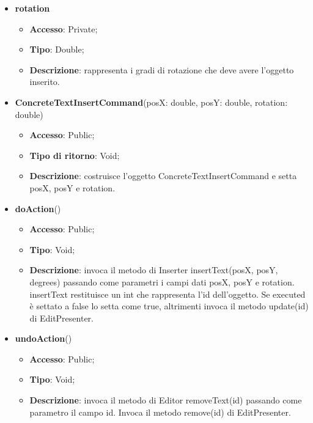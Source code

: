 {{{\begin{itemize}
\begin{itemize}
			\end{itemize}
			\item \textbf{rotation}
			\begin{itemize}
				\item \textbf{Accesso}: Private;
				\item \textbf{Tipo}: Double;
				\item \textbf{Descrizione}: rappresenta i gradi di rotazione che deve avere l’oggetto inserito.
			\end{itemize}
	\end{itemize}
	\begin{itemize}
		\item \textbf{ConcreteTextInsertCommand}(posX: double, posY: double, rotation: double)
		\begin{itemize}
			\item \textbf{Accesso}: Public;
			\item \textbf{Tipo di ritorno}: Void;
			\item \textbf{Descrizione}: costruisce l’oggetto ConcreteTextInsertCommand e setta posX, posY e rotation.
		\end{itemize}
		\item \textbf{doAction}()
		\begin{itemize}
			\item \textbf{Accesso}: Public;
			\item \textbf{Tipo}: Void;
			\item \textbf{Descrizione}: invoca il metodo di Inserter insertText(posX, posY, degrees) passando come parametri i  campi dati posX, posY e rotation. insertText restituisce un int che rappresenta l’id dell’oggetto. Se executed è settato a false lo setta come true, altrimenti invoca il metodo update(id) di EditPresenter.
		\end{itemize}
		\item \textbf{undoAction}()
		\begin{itemize}
			\item \textbf{Accesso}: Public;
			\item \textbf{Tipo}: Void;
			\item \textbf{Descrizione}: invoca il metodo di Editor removeText(id) passando come parametro il campo id. Invoca il metodo remove(id) di EditPresenter.
		\end{itemize}
	\end{itemize}
	}
	
}}
